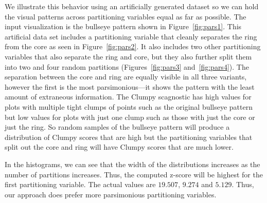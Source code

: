 We illustrate this behavior using an artificially generated dataset so we can hold the visual patterns across partitioning variables equal as far as possible. The input visualization is the bullseye pattern shown in Figure~\ref{fig:pars1}. This artificial data set includes a partitioning variable that cleanly separates the ring from the core as seen in Figure~\ref{fig:pars2}. It also includes two other partitioning variables that also separate the ring and core, but they also further split them into two and four random partitions (Figures~\ref{fig:pars3} and~\ref{fig:pars4}). The separation between the core and ring are equally visible in all three variants, however the first is the most parsimonious---it shows the pattern with the least amount of extraneous information. 
The Clumpy scagnostic has high values for plots with multiple tight clumps of points such as the original bullseye pattern but low values for plots with just one clump such as those with just the core or just the ring. So random samples of the bullseye pattern will produce a distribution of Clumpy scores that are high but the partitioning variables that split out the core and ring will have Clumpy scores that are much lower.

In the histograms, we can see that the width of the distributions increases as the number of partitions increases. Thus, the computed z-score will be highest for the first partitioning variable. The actual values are $19.507$, $9.274$ and $5.129$. Thus, our approach does prefer more parsimonious partitioning variables.

